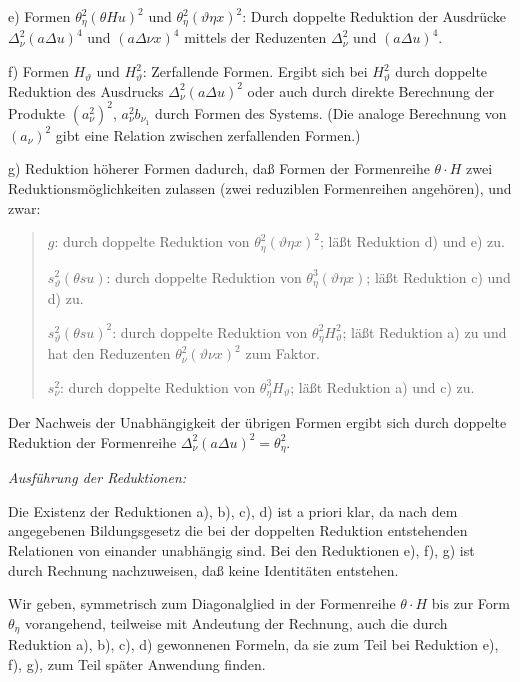 \documentclass[11pt]{article}
\newcommand{\A}{\Delta}
\begin{document}
e) Formen $\theta_\eta^2(\theta Hu)^2$ und $\theta_\eta^2(\vartheta\eta x)^2$: Durch doppelte Reduktion der Ausdrücke $\A_\nu^2(a\A u)^4$ und $(a\A\nu x)^4$ mittels der Reduzenten $\A_\nu^2$ und $(a\A u)^4$.

f) Formen $H_\vartheta$ und $H_\vartheta^2$: Zerfallende Formen. Ergibt sich bei $H_\vartheta^2$ durch doppelte Reduktion des Ausdrucks $\A_\nu^2(a\A u)^2$ oder auch durch direkte Berechnung der Produkte $(a_\nu^2)^2$, $a_\nu^2b_{\nu_1}$ durch Formen des Systems. (Die analoge Berechnung von $(a_\nu)^2$ gibt eine Relation zwischen zerfallenden Formen.)

g) Reduktion höherer Formen dadurch, daß Formen der Formenreihe $\theta\cdot H$ zwei Reduktionsmöglichkeiten zulassen (zwei reduziblen Formenreihen angehören), und zwar:
\begin{quote}\small
$g$: durch doppelte Reduktion von $\theta_\eta^2(\vartheta\eta x)^2$; läßt Reduktion d) und e) zu.\par
$s_\vartheta^2(\theta su)$: durch doppelte Reduktion von $\theta_\eta^3(\vartheta\eta x)$; läßt Reduktion c) und d) zu.\par
$s_\vartheta^2(\theta su)^2$: durch doppelte Reduktion von $\theta_\eta^2H_\vartheta^2$; läßt Reduktion a) zu und hat den Reduzenten $\theta_\nu^2(\vartheta\nu x)^2$ zum Faktor.\par
$s_\nu^2$: durch doppelte Reduktion von $\theta_\eta^3H_\vartheta$; läßt Reduktion a) und c) zu.
\end{quote}
Der Nachweis der Unabhängigkeit der übrigen Formen ergibt sich durch doppelte Reduktion der Formenreihe $\A_\nu^2(a\A u)^2=\theta_\eta^2$.

\noindent\emph{Ausführung der Reduktionen:}

Die Existenz der Reduktionen a), b), c), d) ist a priori klar, da nach dem angegebenen Bildungsgesetz die bei der doppelten Reduktion entstehenden Relationen von einander unabhängig sind. Bei den Reduktionen e), f), g) ist durch Rechnung nachzuweisen, daß keine Identitäten entstehen.

Wir geben, symmetrisch zum Diagonalglied in der Formenreihe $\theta\cdot H$ bis zur Form $\theta_\eta$ vorangehend, teilweise mit Andeutung der Rechnung, auch die durch Reduktion a), b), c), d) gewonnenen Formeln, da sie zum Teil bei Reduktion e), f), g), zum Teil später Anwendung finden.
\end{document}
